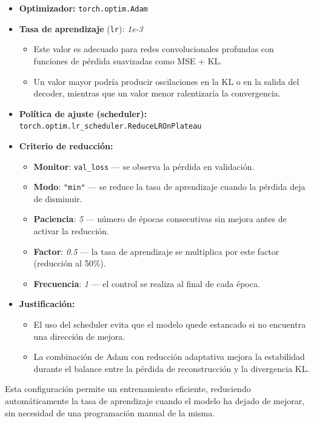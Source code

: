\begin{itemize}
    \item \textbf{Optimizador:} \texttt{torch.optim.Adam}
    \item \textbf{Tasa de aprendizaje} (\texttt{lr}): \textit{1e-3}
    \begin{itemize}
        \item Este valor es adecuado para redes convolucionales profundas con funciones de pérdida suavizadas como MSE + KL.
        \item Un valor mayor podría producir oscilaciones en la KL o en la salida del decoder, mientras que un valor menor ralentizaría la convergencia.
    \end{itemize}

    \item \textbf{Política de ajuste (scheduler):} \texttt{torch.optim.lr\_scheduler.ReduceLROnPlateau}
    \item \textbf{Criterio de reducción:}
    \begin{itemize}
        \item \textbf{Monitor}: \texttt{val\_loss} — se observa la pérdida en validación.
        \item \textbf{Modo}: \texttt{"min"} — se reduce la tasa de aprendizaje cuando la pérdida deja de disminuir.
        \item \textbf{Paciencia}: \textit{5} — número de épocas consecutivas sin mejora antes de activar la reducción.
        \item \textbf{Factor}: \textit{0.5} — la tasa de aprendizaje se multiplica por este factor (reducción al 50\%).
        \item \textbf{Frecuencia}: \textit{1} — el control se realiza al final de cada época.
    \end{itemize}

    \item \textbf{Justificación:}
    \begin{itemize}
        \item El uso del scheduler evita que el modelo quede estancado si no encuentra una dirección de mejora.
        \item La combinación de Adam con reducción adaptativa mejora la estabilidad durante el balance entre la pérdida de reconstrucción y la divergencia KL.
    \end{itemize}
\end{itemize}

\noindent Esta configuración permite un entrenamiento eficiente, reduciendo automáticamente la tasa de aprendizaje cuando el modelo ha dejado de mejorar, sin necesidad de una programación manual de la misma.


